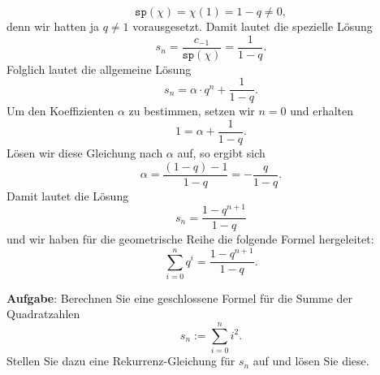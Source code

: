 \[ \mathtt{sp}(\chi) = \chi(1) = 1 - q \not= 0, \]  
denn wir hatten ja $q \not= 1$ vorausgesetzt.  Damit lautet die spezielle L\"{o}sung
\[ s_n = \frac{c_{-1}}{\mathtt{sp}(\chi)} = \frac{1}{1 - q}. \]
Folglich lautet die allgemeine L\"{o}sung
\[ s_n = \alpha \cdot q^n + \frac{1}{1 - q}.  \]
Um den Koeffizienten $\alpha$ zu bestimmen, setzen wir $n=0$ und erhalten
\[ 1 = \alpha + \frac{1}{1 - q}. \]
L\"{o}sen wir diese Gleichung nach $\alpha$ auf, so ergibt sich
\[ \alpha = \frac{(1 - q) - 1}{1 - q} = - \frac{q}{1 - q}. \]
Damit lautet die L\"{o}sung
\[ s_n = \frac{1 - q^{n+1}}{1 - q} \]
und wir haben f\"{u}r die geometrische Reihe die folgende Formel hergeleitet:
\[ \sum\limits_{i=0}^{n} q^i = \frac{1 - q^{n+1}}{1 - q}. \]
\pagebreak

\noindent
\textbf{Aufgabe}:
Berechnen Sie eine geschlossene Formel f\"{u}r die Summe
der Quadratzahlen
\[ s_n := \sum\limits_{i=0}^{n} i^2. \]
Stellen Sie dazu eine Rekurrenz-Gleichung f\"{u}r $s_n$ auf und l\"{o}sen Sie diese.

